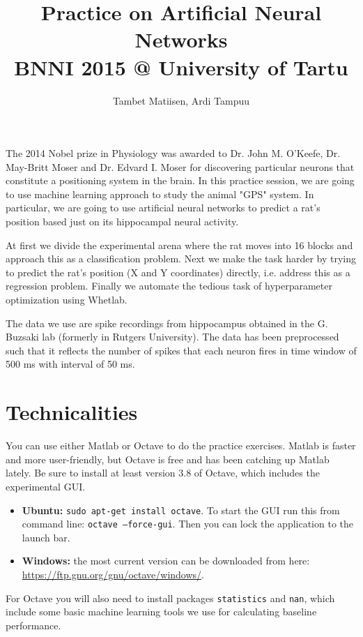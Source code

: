 \documentclass[a4paper,11pt]{article}
\author{\large{Tambet Matiisen, Ardi Tampuu}}
\title{\huge{Practice on Artificial Neural Networks}\\\LARGE{BNNI 2015 @ University of Tartu}}
\begin{document}
\maketitle

%
%
The 2014 Nobel prize in Physiology was awarded to Dr. John M. O'Keefe, Dr. May-Britt Moser and Dr. Edvard I. Moser for discovering particular neurons that constitute a positioning system in the brain. In this practice session, we are going to use machine learning approach to study the animal "GPS" system. In particular, we are going to use artificial neural networks to predict a rat's position based just on its hippocampal neural activity.

At first we divide the experimental arena where the rat moves into 16 blocks and approach this as a classification problem. Next we make the task harder by trying to predict the rat's position (X and Y coordinates) directly, i.e. address this as a regression problem. Finally we automate the tedious task of hyperparameter optimization using Whetlab. 

The data we use are spike recordings from hippocampus obtained in the G. Buzsaki lab (formerly in Rutgers University). The data has been preprocessed such that it reflects the number of spikes that each neuron fires in time window of 500 ms with interval of 50 ms.

%
%
\section{Technicalities}

You can use either Matlab or Octave to do the practice exercises. Matlab is faster and more user-friendly, but Octave is free and has been catching up Matlab lately. Be sure to install at least version 3.8 of Octave, which includes the experimental GUI.
\begin{itemize}
	\item \textbf{Ubuntu:} \texttt{sudo apt-get install octave}. To start the GUI run this from command line: \texttt{octave --force-gui}. Then you can lock the application to the launch bar. 
	\item \textbf{Windows:} the most current version can be downloaded from here:\\ \url{https://ftp.gnu.org/gnu/octave/windows/}.
\end{itemize}

For Octave you will also need to install packages \texttt{statistics} and \texttt{nan}, which include some basic machine learning tools we use for calculating baseline performance. 
\end{document}
